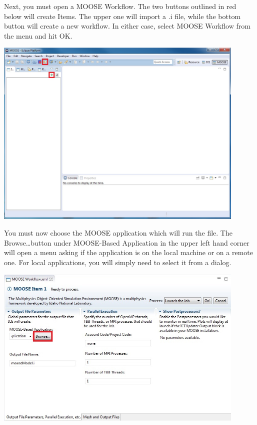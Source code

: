 \documentclass{article}
\begin{document}
Next, you must open a MOOSE Workflow. The two buttons outlined in red below will
create Items. The upper one will import a .i file, while the bottom button will
create a new workflow. In either case, select MOOSE Workflow from the menu and
hit OK.

\begin{center}
\includegraphics[width=12cm]{images/MOOSEPerspectiveNewWorkflow}
\end{center}

You must now choose the MOOSE application which will run the file. The
Browse\ldots button under MOOSE-Based Application in the upper left hand corner
will open a menu asking if the application is on the local machine or on a
remote one. For local applications, you will simply need to select it from a
dialog. 

\begin{center}
\includegraphics[width=12cm]{images/MOOSEItem}
\end{center}
\end{document}
